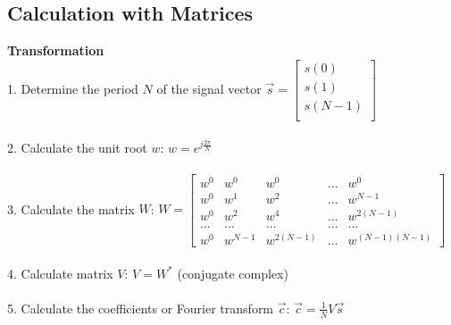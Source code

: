     \subsection{Calculation with Matrices}
        \textbf{Transformation}\\
        1. Determine the period $N$ of the signal vector $\vec{s}=
        \begin{bmatrix}
        s(0) \\
        s(1) \\
        s(N-1)\\
        \end{bmatrix}$\\ \\
        2. Calculate the unit root $w$: $w=e^{j\frac{2 \pi}{N}}$\\ \\
        3. Calculate the matrix $W$: $W=
        \begin{bmatrix}
        w^0 & w^0 & w^0 & \ldots & w^0\\
        w^0 & w^1 & w^2 & \ldots & w^{N-1}\\
        w^0 & w^2 & w^4 & \ldots & w^{2(N-1)}\\
        \ldots & \ldots & \ldots & \ldots & \ldots\\
        w^0 & w^{N-1} & w^{2(N-1)} & \ldots & w^{(N-1)(N-1)}                        
        \end{bmatrix}$\\ \\
        4. Calculate matrix $V$: $V=W^*$ (conjugate complex)\\ \\
        5. Calculate the coefficients or Fourier transform $\vec{c}$:
        $\vec{c}=\frac{1}{N}V\vec{s}$\\

